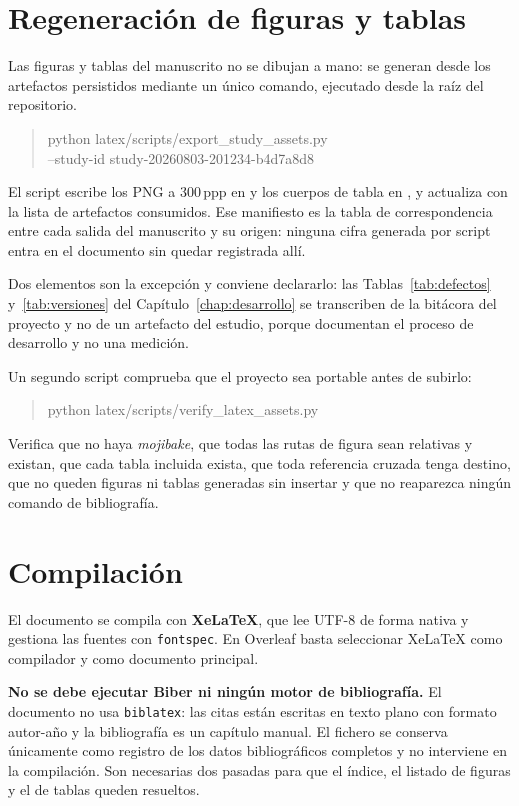 \section{Regeneración de figuras y tablas}

Las figuras y tablas del manuscrito no se dibujan a mano: se generan desde los artefactos
persistidos mediante un único comando, ejecutado desde la raíz del repositorio.

\begin{quote}
\ttfamily
python latex/scripts/export\_study\_assets.py \\
\hspace*{2em}--study-id study-20260803-201234-b4d7a8d8
\end{quote}

El script escribe los PNG a 300\,ppp en  y los cuerpos de tabla en
, y actualiza  con la lista de
artefactos consumidos. Ese manifiesto es la tabla de correspondencia entre cada salida del
manuscrito y su origen: ninguna cifra generada por script entra en el documento sin quedar
registrada allí.

Dos elementos son la excepción y conviene declararlo: las Tablas~\ref{tab:defectos}
y~\ref{tab:versiones} del Capítulo~\ref{chap:desarrollo} se transcriben de la bitácora del proyecto
y no de un artefacto del estudio, porque documentan el proceso de desarrollo y no una medición.

Un segundo script comprueba que el proyecto sea portable antes de subirlo:

\begin{quote}
\ttfamily
python latex/scripts/verify\_latex\_assets.py
\end{quote}

Verifica que no haya \textit{mojibake}, que todas las rutas de figura sean relativas y existan, que
cada tabla incluida exista, que toda referencia cruzada tenga destino, que no queden figuras ni
tablas generadas sin insertar y que no reaparezca ningún comando de bibliografía.

\section{Compilación}

El documento se compila con \textbf{XeLaTeX}, que lee UTF-8 de forma nativa y gestiona las fuentes
con \texttt{fontspec}. En Overleaf basta seleccionar XeLaTeX como compilador y 
como documento principal.

\textbf{No se debe ejecutar Biber ni ningún motor de bibliografía.} El documento no usa
\texttt{biblatex}: las citas están escritas en texto plano con formato autor-año y la bibliografía
es un capítulo manual. El fichero  se conserva únicamente como
registro de los datos bibliográficos completos y no interviene en la compilación. Son necesarias dos
pasadas para que el índice, el listado de figuras y el de tablas queden resueltos.
